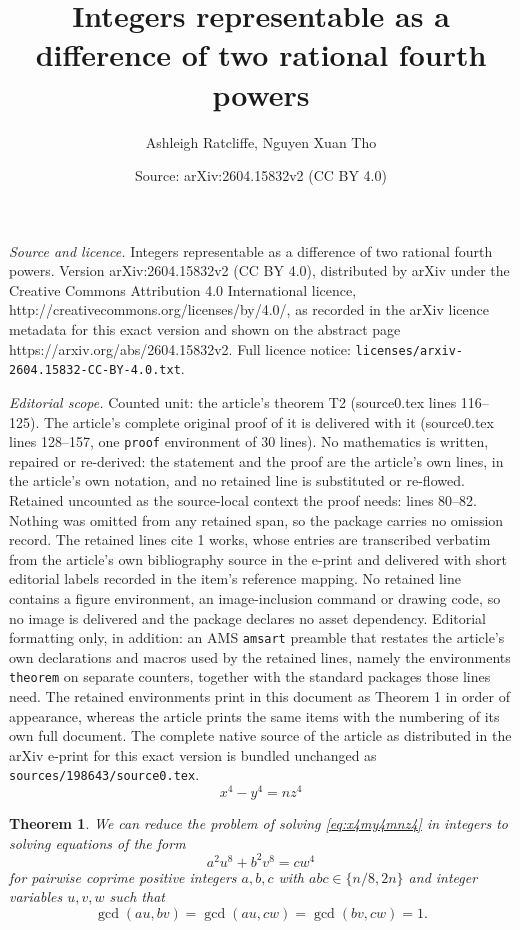 \documentclass[10pt,a4paper]{amsart}
\title{Integers representable as a difference of two rational fourth powers}
\author{Ashleigh Ratcliffe, Nguyen Xuan Tho}
\date{Source: arXiv:2604.15832v2 (CC BY 4.0)}
\newtheorem{theorem}{Theorem}
\begin{document}
\maketitle

\noindent\emph{Source and licence.} Integers representable as a difference of two rational fourth powers. Version arXiv:2604.15832v2 (CC BY 4.0), distributed by arXiv under the Creative Commons Attribution 4.0 International licence, http://creativecommons.org/licenses/by/4.0/, as recorded in the arXiv licence metadata for this exact version and shown on the abstract page https://arxiv.org/abs/2604.15832v2. Full licence notice: \texttt{licenses/arxiv-2604.15832-CC-BY-4.0.txt}.\par\smallskip

\noindent\textit{Editorial scope.} Counted unit: the article's theorem T2 (source0.tex lines 116--125). The article's complete original proof of it is delivered with it (source0.tex lines 128--157, one \texttt{proof} environment of 30 lines). No mathematics is written, repaired or re-derived: the statement and the proof are the article's own lines, in the article's own notation, and no retained line is substituted or re-flowed.  Retained uncounted as the source-local context the proof needs: lines 80--82.  Nothing was omitted from any retained span, so the package carries no omission record.  The retained lines cite 1 works, whose entries are transcribed verbatim from the article's own bibliography source in the e-print and delivered with short editorial labels recorded in the item's reference mapping.  No retained line contains a figure environment, an image-inclusion command or drawing code, so no image is delivered and the package declares no asset dependency.  Editorial formatting only, in addition: an AMS \texttt{amsart} preamble that restates the article's own declarations and macros used by the retained lines, namely the environments \texttt{theorem} on separate counters, together with the standard packages those lines need.  The retained environments print in this document as Theorem 1 in order of appearance, whereas the article prints the same items with the numbering of its own full document.  The complete native source of the article as distributed in the arXiv e-print for this exact version is bundled unchanged as \texttt{sources/198643/source0.tex}.
	\begin{equation}\label{eq:x4my4mnz4}
		x^4-y^4=nz^4
	\end{equation} 

\begin{theorem}\label{T2}\cite[Section 6.3.4]{mainbook} 
We can reduce the problem of solving \eqref{eq:x4my4mnz4} in integers to solving equations of the form
\begin{equation}\label{eq:abcuvw}
a^2u^8+b^2v^8=c w^4
\end{equation}
for pairwise coprime positive integers $a,b,c$ with $abc\in\{n/8,2n\}$ and integer variables $u,v,w$ such that
\begin{equation}\label{eq:cond}
\gcd(au,bv)= \gcd(au,cw)= \gcd(bv,cw)= 1.
\end{equation}
\end{theorem}
\end{document}
